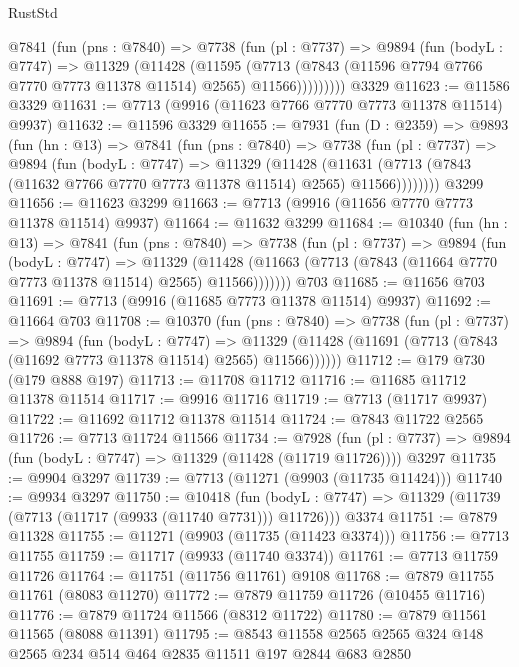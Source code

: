 \begin{lexlean}{RustStd}
\begin{coremodule}
        @7841
          (fun (pns : @7840) =>
          @7738
            (fun (pl : @7737) =>
            @9894
              (fun (bodyL : @7747) =>
              @11329
                (@11428
                  (@11595
                    (@7713
                      (@7843 (@11596 @7794 @7766 @7770 @7773 @11378 @11514) @2565)
                      @11566)))))))))
    @3329
@11623 := @11586 @3329
@11631 := @7713 (@9916 (@11623 @7766 @7770 @7773 @11378 @11514) @9937)
@11632 := @11596 @3329
@11655 := @7931
    (fun (D : @2359) =>
    @9893
      (fun (hn : @13) =>
      @7841
        (fun (pns : @7840) =>
        @7738
          (fun (pl : @7737) =>
          @9894
            (fun (bodyL : @7747) =>
            @11329
              (@11428
                (@11631 (@7713 (@7843 (@11632 @7766 @7770 @7773 @11378 @11514) @2565) @11566))))))))
    @3299
@11656 := @11623 @3299
@11663 := @7713 (@9916 (@11656 @7770 @7773 @11378 @11514) @9937)
@11664 := @11632 @3299
@11684 := @10340
    (fun (hn : @13) =>
    @7841
      (fun (pns : @7840) =>
      @7738
        (fun (pl : @7737) =>
        @9894
          (fun (bodyL : @7747) =>
          @11329
            (@11428 (@11663 (@7713 (@7843 (@11664 @7770 @7773 @11378 @11514) @2565) @11566)))))))
    @703
@11685 := @11656 @703
@11691 := @7713 (@9916 (@11685 @7773 @11378 @11514) @9937)
@11692 := @11664 @703
@11708 := @10370
    (fun (pns : @7840) =>
    @7738
      (fun (pl : @7737) =>
      @9894
        (fun (bodyL : @7747) =>
        @11329 (@11428 (@11691 (@7713 (@7843 (@11692 @7773 @11378 @11514) @2565) @11566))))))
@11712 := @179 @730 (@179 @888 @197)
@11713 := @11708 @11712
@11716 := @11685 @11712 @11378 @11514
@11717 := @9916 @11716
@11719 := @7713 (@11717 @9937)
@11722 := @11692 @11712 @11378 @11514
@11724 := @7843 @11722 @2565
@11726 := @7713 @11724 @11566
@11734 := @7928
    (fun (pl : @7737) => @9894 (fun (bodyL : @7747) => @11329 (@11428 (@11719 @11726))))
    @3297
@11735 := @9904 @3297
@11739 := @7713 (@11271 (@9903 (@11735 @11424)))
@11740 := @9934 @3297
@11750 := @10418
    (fun (bodyL : @7747) => @11329 (@11739 (@7713 (@11717 (@9933 (@11740 @7731))) @11726)))
    @3374
@11751 := @7879 @11328
@11755 := @11271 (@9903 (@11735 (@11423 @3374)))
@11756 := @7713 @11755
@11759 := @11717 (@9933 (@11740 @3374))
@11761 := @7713 @11759 @11726
@11764 := @11751 (@11756 @11761) @9108
@11768 := @7879 @11755 @11761 (@8083 @11270)
@11772 := @7879 @11759 @11726 (@10455 @11716)
@11776 := @7879 @11724 @11566 (@8312 @11722)
@11780 := @7879 @11561 @11565 (@8088 @11391)
@11795 := @8543 @11558 @2565 @2565 @324 @148 @2565 @234 @514 @464 @2835 @11511 @197 @2844 @683 @2850

\end{coremodule}
\end{lexlean}

